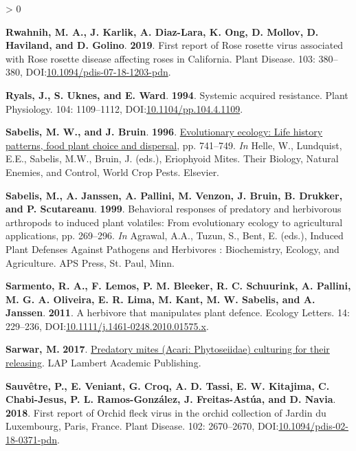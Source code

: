 \documentclass{ufdissertation}[overrideChapters] %
\newlength{\cslhangindent}
\newenvironment{CSLReferences}[2] %
 {%
  \setlength{\parindent}{0pt}
  \ifodd #1 \everypar{\setlength{\hangindent}{\cslhangindent}}\ignorespaces\fi
  \ifnum #2 > 0
  \setlength{\parskip}{#2\baselineskip}
  \fi
 }%
 {}
\begin{document}
{\begin{CSLReferences}{1}{1}
\leavevmode{}%
\textbf{Rwahnih, M. A., J. Karlik, A. Diaz-Lara, K. Ong, D. Mollov, D. Haviland, and D. Golino}. \textbf{2019}. First report of {Rose rosette virus} associated with {Rose rosette disease} affecting roses in {California}. Plant Disease. 103: 380--380, DOI:\href{https://doi.org/10.1094/pdis-07-18-1203-pdn}{10.1094/pdis-07-18-1203-pdn}.

\leavevmode{}%
\textbf{Ryals, J., S. Uknes, and E. Ward}. \textbf{1994}. Systemic acquired resistance. Plant Physiology. 104: 1109--1112, DOI:\href{https://doi.org/10.1104/pp.104.4.1109}{10.1104/pp.104.4.1109}.

\leavevmode{}%
\textbf{Sabelis, M. W., and J. Bruin}. \textbf{1996}. \href{https://doi.org/10.1016/s1572-4379(96)80050-9}{Evolutionary ecology: Life history patterns, food plant choice and dispersal}, pp. 741--749. \emph{In} Helle, W., Lundquist, E.E., Sabelis, M.W., Bruin, J. (eds.), Eriophyoid Mites. Their Biology, Natural Enemies, and Control, World Crop Pests. Elsevier.

\leavevmode{}%
\textbf{Sabelis, M., A. Janssen, A. Pallini, M. Venzon, J. Bruin, B. Drukker, and P. Scutareanu}. \textbf{1999}. Behavioral responses of predatory and herbivorous arthropods to induced plant volatiles: From evolutionary ecology to agricultural applications, pp. 269--296. \emph{In} Agrawal, A.A., Tuzun, S., Bent, E. (eds.), Induced Plant Defenses Against Pathogens and Herbivores : Biochemistry, Ecology, and Agriculture. APS Press, St. Paul, Minn.

\leavevmode{}%
\textbf{Sarmento, R. A., F. Lemos, P. M. Bleeker, R. C. Schuurink, A. Pallini, M. G. A. Oliveira, E. R. Lima, M. Kant, M. W. Sabelis, and A. Janssen}. \textbf{2011}. A herbivore that manipulates plant defence. Ecology Letters. 14: 229--236, DOI:\href{https://doi.org/10.1111/j.1461-0248.2010.01575.x}{10.1111/j.1461-0248.2010.01575.x}.

\leavevmode{}%
\textbf{Sarwar, M.} \textbf{2017}. \href{https://www.ebook.de/de/product/29856502/muhammad_sarwar_predatory_mites_\%7BAcari\%7D_\%7BPhytoseiidae\%7D_culturing_for_their_releasing.html}{Predatory mites ({Acari}: {Phytoseiidae}) culturing for their releasing}. LAP Lambert Academic Publishing.

\leavevmode{}%
\textbf{Sauvêtre, P., E. Veniant, G. Croq, A. D. Tassi, E. W. Kitajima, C. Chabi-Jesus, P. L. Ramos-González, J. Freitas-Astúa, and D. Navia}. \textbf{2018}. First report of {Orchid fleck virus} in the orchid collection of {Jardin du Luxembourg}, {Paris, France}. Plant Disease. 102: 2670--2670, DOI:\href{https://doi.org/10.1094/pdis-02-18-0371-pdn}{10.1094/pdis-02-18-0371-pdn}.


\end{CSLReferences}}
\end{document}
